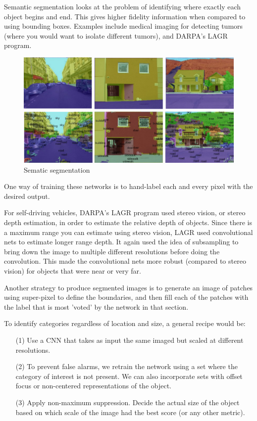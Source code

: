 Semantic segmentation looks at the problem of identifying where exactly each object begins and end.
This gives higher fidelity information when compared to using bounding boxes.
Examples include medical imaging for detecting tumors (where you would want to isolate different tumors), and DARPA's LAGR program.

\begin{figure}[ht]
\centering
	\includegraphics[width=0.8\linewidth]{lectures/04-a/images/semantic-segmentation.png}
	\caption{Sematic segmentation}
\label{fig:SemanticSegmentation}
\end{figure}

One way of training these networks is to hand-label each and every pixel with the desired output.

For self-driving vehicles, DARPA's LAGR program used stereo vision, or stereo depth estimation, in order to estimate the relative depth of objects.
Since there is a maximum range you can estimate using stereo vision, LAGR used convolutional nets to estimate longer range depth.
It again used the idea of subsampling to bring down the image to multiple different resolutions before doing the convolution.
This made the convolutional nets more robust (compared to stereo vision) for objects that were near or very far.


Another strategy to produce segmented images is to generate an image of patches using super-pixel to define the boundaries, and then fill each of the patches with the label that is most 'voted' by the network in that section. 

\noindent
To identify categories regardless of location and size, a general recipe would be:
\begin{itemize}
\item[(1)] Use a CNN that takes as input the same imaged but scaled at different resolutions. 
\item[(2)] To prevent false alarms, we retrain the network using a set where the category of interest is not present. We can also incorporate sets with offset focus or non-centered representations of the object. 
\item[(3)] Apply non-maximum suppression. Decide the actual size of the object based on which scale of the image had the best score (or any other metric). 
\end{itemize}

